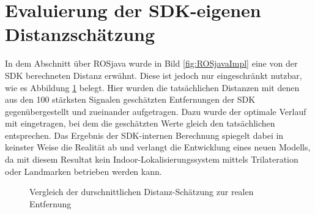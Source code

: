 \section{Evaluierung der SDK-eigenen Distanzschätzung}
In dem Abschnitt über ROSjava wurde in Bild \ref{fig:ROSjavaImpl} eine von der SDK berechneten Distanz erwähnt. Diese ist jedoch nur eingeschränkt nutzbar, wie es Abbildung \ref{fig:DisrealDistance} belegt. Hier wurden die tatsächlichen Distanzen mit denen aus den 100 stärksten Signalen geschätzten Entfernungen der SDK gegenübergestellt und zueinander aufgetragen. Dazu wurde der optimale Verlauf mit eingetragen, bei dem die geschätzten Werte gleich den tatsächlichen entsprechen. Das Ergebnis der SDK-internen Berechnung spiegelt dabei in keinster Weise die Realität ab und verlangt die Entwicklung eines neuen Modells, da mit diesem Resultat kein Indoor-Lokalisierungssystem mittels Trilateration oder Landmarken betrieben werden kann.  
\begin{figure}[H] 
\centering
{}
\caption{Vergleich der durschnittlichen Distanz-Schätzung zur realen Entfernung}
\label{fig:DisrealDistance}
\end{figure}
